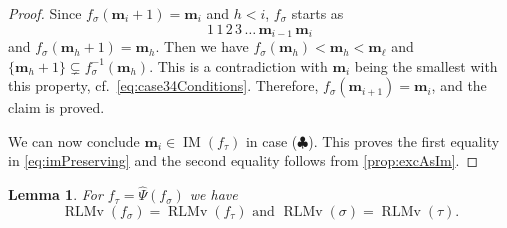 \documentclass[reqno]{amsart}
\newtheorem{lemma}[theorem]{Lemma}
\theoremstyle{definition}
\newcommand{\fretherD}{\hat{\Psi}}
\newcommand{\caseFour}{\ensuremath{\clubsuit}}
\newcommand{\img}{\mathbf{m}}
\DeclareMathOperator{\RLMv}{RLMv}
\DeclareMathOperator{\supp}{IM}
\begin{document}
\begin{proof}
Since $f_\sigma(\img_i+1)=\img_i$ and  $h<i$, $f_{\sigma}$ starts as
\[
1\,1\,2\,3\,\dotsc\,\img_{i-1}\,\img_i
\]
and 
$f_{\sigma}(\img_h+1)=\img_h$. 
Then we have 
$f_{\sigma}(\img_h)<\img_h<\img_\ell$ and 
$\{\img_h+1\} \subsetneq f_{\sigma}^{-1}(\img_h)$.
%
This is a contradiction with $\img_i$ being the smallest 
with this property, cf.~\eqref{eq:case34Conditions}.
Therefore, $f_{\sigma}(\img_{i+1})=\img_i$, and the claim is proved.
\medskip 

We can now conclude $\img_i\in \supp(f_{\tau})$ in case (\caseFour). 
This proves the first equality in \eqref{eq:imPreserving}
and the second equality follows from \cref{prop:excAsIm}. 
\end{proof}

 
 
 
\begin{lemma}\label{lem:rlmPreserving}
For $f_{\tau} = \fretherD(f_{\sigma})$ we have 
\begin{equation}
 \RLMv(f_{\sigma}) = \RLMv(f_{\tau}) \text{ and }
 \RLMv(\sigma) = \RLMv(\tau).
\end{equation}
\end{lemma}
\end{document}
